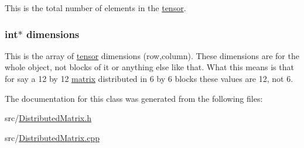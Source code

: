 This is the total number of elements in the \hyperlink{classJKBuilder_1_1tensor}{tensor}. \hypertarget{classJKBuilder_1_1tensor_a2ce1e6e0782ddee097f2c4aa2663d3e9}{
\subsubsection[{dimensions}]{\setlength{\rightskip}{0pt plus 5cm}int$\ast$ {\bf dimensions}}}
\label{classJKBuilder_1_1tensor_a2ce1e6e0782ddee097f2c4aa2663d3e9}


This is the array of \hyperlink{classJKBuilder_1_1tensor}{tensor} dimensions (row,column). These dimensions are for the whole object, not blocks of it or anything else like that. What this means is that for say a 12 by 12 \hyperlink{classJKBuilder_1_1matrix}{matrix} distributed in 6 by 6 blocks these values are 12, not 6. 

The documentation for this class was generated from the following files:\begin{DoxyCompactItemize}
\item 
src/\hyperlink{DistributedMatrix_8h}{DistributedMatrix.h}\item 
src/\hyperlink{DistributedMatrix_8cpp}{DistributedMatrix.cpp}\end{DoxyCompactItemize}
